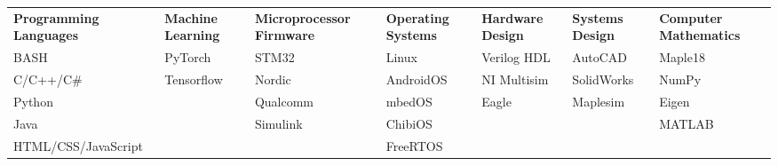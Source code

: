 
\begin{cvparagraph}

\begin{center}
  \begin{tabular}{L L L L L L L}
  \textbf{Programming Languages} & \textbf{Machine Learning} & \textbf{Microprocessor Firmware} & \textbf{Operating Systems} & \textbf{Hardware Design} & \textbf{Systems Design} & \textbf{Computer Mathematics} \\
  BASH                 & PyTorch    & STM32    & Linux     & Verilog HDL & AutoCAD    & Maple18 \\
  C/C++/C\#            & Tensorflow & Nordic   & AndroidOS & NI Multisim & SolidWorks & NumPy   \\
  Python               &            & Qualcomm & mbedOS    & Eagle       & Maplesim   & Eigen   \\
  Java                 &            & Simulink & ChibiOS   &             &            & MATLAB  \\
  HTML/CSS/JavaScript  &            &          & FreeRTOS  &             &            &         \\
  \end{tabular}
\end{center}
\end{cvparagraph}
